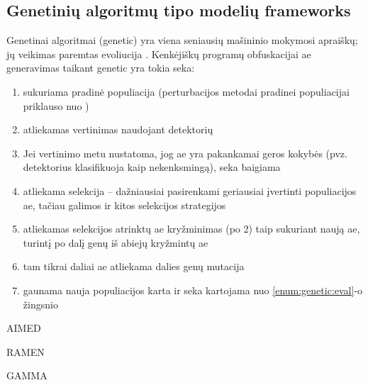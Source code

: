 \subsection{Genetinių algoritmų tipo modelių \glspl{framework}}\label{sec:literature:genetic}

Genetinai algoritmai (\acs{genetic}) yra viena seniausių mašininio mokymosi apraiškų; jų veikimas paremtas evoliucija \citeplace. Kenkėjiškų programų obfuskacijai \acs{ae} generavimas taikant \acs{genetic} yra tokia seka:
\begin{enumerate}
    \item sukuriama pradinė populiacija (perturbacijos metodai pradinei populiacijai priklauso nuo )
    \item atliekamas vertinimas naudojant detektorių\label{enum:genetic:eval}
    \item Jei vertinimo metu nustatoma, jog \acs{ae} yra pakankamai geros kokybės (pvz. detektorius klasifikuoja kaip nekenksmingą), seka baigiama
    \item atliekama selekcija -- dažniausiai pasirenkami geriausiai įvertinti populiacijos \acs{ae}, tačiau galimos ir kitos selekcijos strategijos
    \item atliekamas selekcijos atrinktų \acs{ae} kryžminimas (po 2) taip sukuriant naują \acs{ae}, turintį po dalį genų iš abiejų kryžmintų \acs{ae}
    \item tam tikrai daliai \ac{ae} atliekama dalies genų mutacija
    \item gaunama nauja populiacijos karta ir seka kartojama nuo \ref{enum:genetic:eval}-o žingsnio
\end{enumerate}
\cite{yusteOptimizationCodeCaves2022}

\begin{describeFramework}{AIMED}{\cite{castroAIMEDEvolvingMalware2019}}
\purpose{}
\surrogate{}
\mainModel{}
\end{describeFramework}

\begin{describeFramework}{RAMEN}{\cite{demetrioAdversarialEXEmplesSurvey2021}}
\purpose{}
\surrogate{}
\mainModel{}
\end{describeFramework}

\begin{describeFramework}{GAMMA}{\cite{demetrioFunctionalityPreservingBlackBoxOptimization2021}}
\purpose{}
\surrogate{}
\mainModel{}
\end{describeFramework}
